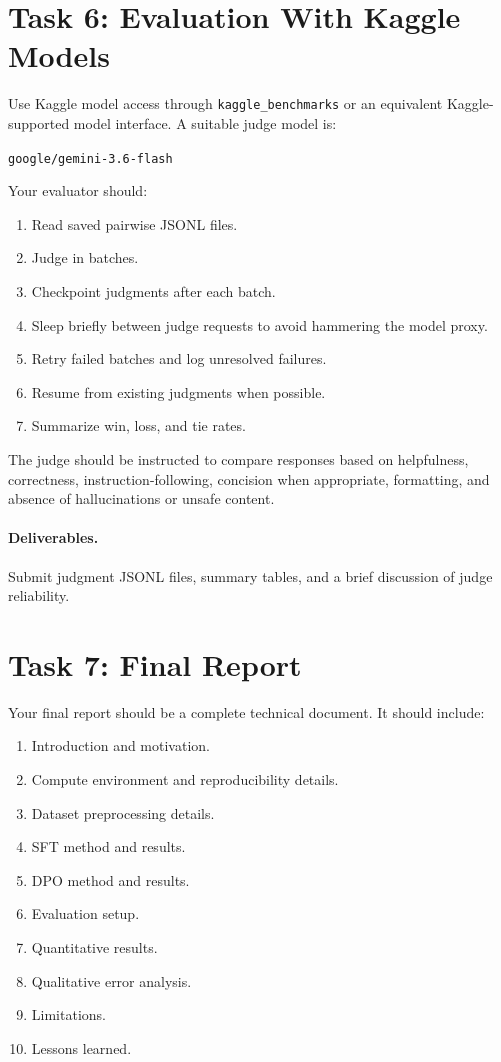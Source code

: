 \documentclass[11pt]{article}
\begin{document}
\section{Task 6: Evaluation With Kaggle Models}
Use Kaggle model access through \texttt{kaggle\_benchmarks} or an equivalent Kaggle-supported model interface. A suitable judge model is:
\begin{center}
\texttt{google/gemini-3.6-flash}
\end{center}
Your evaluator should:
\begin{enumerate}[leftmargin=*]
  \item Read saved pairwise JSONL files.
  \item Judge in batches.
  \item Checkpoint judgments after each batch.
  \item Sleep briefly between judge requests to avoid hammering the model proxy.
  \item Retry failed batches and log unresolved failures.
  \item Resume from existing judgments when possible.
  \item Summarize win, loss, and tie rates.
\end{enumerate}

The judge should be instructed to compare responses based on helpfulness, correctness, instruction-following, concision when appropriate, formatting, and absence of hallucinations or unsafe content.

\paragraph{Deliverables.}
Submit judgment JSONL files, summary tables, and a brief discussion of judge reliability.

\section{Task 7: Final Report}
Your final report should be a complete technical document. It should include:
\begin{enumerate}[leftmargin=*]
  \item Introduction and motivation.
  \item Compute environment and reproducibility details.
  \item Dataset preprocessing details.
  \item SFT method and results.
  \item DPO method and results.
  \item Evaluation setup.
  \item Quantitative results.
  \item Qualitative error analysis.
  \item Limitations.
  \item Lessons learned.
\end{enumerate}
\end{document}
